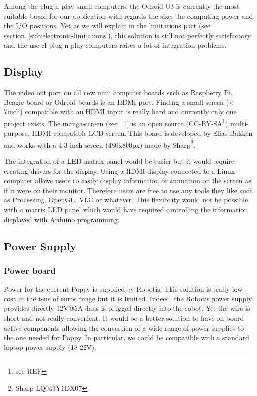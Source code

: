 Among the plug-n-play small computers, the Odroid U3 is currently the most suitable board for our application with regards the size, the computing power and the I/O positions.
Yet as we will explain in the limitations part (see section~\ref{sub:electronic-limitations}), this solution is still not perfectly satisfactory and the use of plug-n-play computers raises a lot of integration problems.

\subsection{Display} %

The video out port on all new mini computer boards such as Raspberry Pi, Beagle board or Odroid boards is an HDMI port. Finding a small screen (< 7inch) compatible with an HDMI input is really hard and currently only one project exists. The manga-screen (see \figurename~\ref{fig:manga-screen}) is an open source (CC-BY-SA\footnote{see REF}) multi-purpose, HDMI-compatible LCD screen. This board is developed by Elias Bakken and works with a 4.3 inch screen (480x800px) made by Sharp\footnote{Sharp LQ043Y1DX07}.

\begin{figure}[ht]
\centering
    \hfil
    \caption{}
    \label{fig:manga-screen}
\end{figure}

The integration of a LED matrix panel would be easier but it would require creating drivers for the display.
Using a HDMI display connected to a Linux computer allows users to easily display information or animation on the screen as if it were on their monitor. Therefore users are free to use any tools they like such as Processing, OpenGL, VLC or whatever. This flexibility would not be possible with a matrix LED panel which would have required controlling the information displayed with Arduino programming.

\subsection{Power Supply} %
\label{ssub:alimentation}

\subsubsection{Power board} %
Power for the current Poppy is supplied by Robotis. This solution is really low-cost in the tens of euros range but it is limited. Indeed, the Robotis power supply provides directly 12V@5A dans is plugged directly into the robot. Yet the wire is short and not really convenient. It would be a better solution to have on board active components allowing the conversion of a wide range of power supplies to the one needed for Poppy. In particular, we could be compatible with a standard laptop power supply (18-22V).

